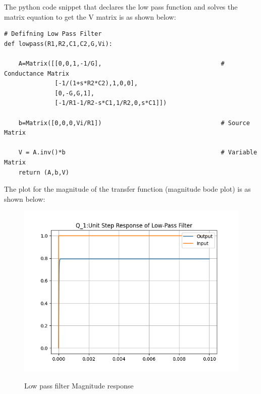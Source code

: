 \documentclass[11pt, a4paper]{article}
\begin{document}
The python code snippet that declares the low pass function and solves the matrix equation to get the V matrix is as shown below:
\begin{verbatim}
# Defifning Low Pass Filter
def lowpass(R1,R2,C1,C2,G,Vi):
    
    A=Matrix([[0,0,1,-1/G],                                 # Conductance Matrix
              [-1/(1+s*R2*C2),1,0,0],
              [0,-G,G,1], 
              [-1/R1-1/R2-s*C1,1/R2,0,s*C1]])
    
    b=Matrix([0,0,0,Vi/R1])                                 # Source Matrix

    V = A.inv()*b                                           # Variable Matrix
    return (A,b,V)
\end{verbatim}
The plot for the magnitude of the transfer function (magnitude bode plot) is as shown below:
\begin{figure}[!tbh]
   	\centering
   	\includegraphics[width=1.0\textwidth]{Figure0.png}
   	\label{fig:32}
   	\caption{Low pass filter Magnitude response}
   \end{figure}
\end{document}
